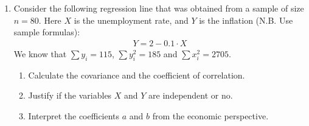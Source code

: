 \documentclass[12pt]{article}
\begin{document}
\begin{enumerate}
{\begin{enumerate}
\item Find the slope of the regression \( Y = a + b \cdot X \) and interpret it:

\begin{itemize}
    \item The slope \( b \) is calculated as:
    \[
    b = \frac{\sigma_{xy}}{\sigma_x^2} = \frac{-0.02}{6.16} = -0.0032.
    \]
    \item Interpretation: For each additional degree of Celsius in temperature, the electricity consumption \( Y \) is expected to decrease by approximately \( 0.0032 \) kWh. However, since the slope is very small, this change is negligible.
\end{itemize}

\item What is the predicted daily electricity consumption in kWh if the temperature is \( x^* = 19 \) degrees of Celsius?

\begin{itemize}
    \item The predicted electricity consumption is calculated using the regression equation:
    \[
    \hat{Y} = a + b \cdot x^*.
    \]
    \item First, calculate the intercept \( a \):
    \[
    a = \bar{y} - b \cdot \bar{x} = 5.6 - (-0.0032 \times 20.2) \approx 5.6.
    \]
    \item Now, substitute \( x^* = 19 \) into the regression equation:
    \[
    \hat{Y} = 5.6 + (-0.0032) \times 19 \approx 5.6 \text{ kWh}.
    \]
    \item Interpretation: If the temperature is \( 19 \) degrees Celsius, the model predicts an electricity consumption of approximately \( 5.6 \) kWh.
\end{itemize}

\end{enumerate}


}

\item   Consider the following regression line that was obtained from a sample of size $n=80$. Here $X$ is the unemployment rate, and $Y$ is the inflation (N.B. Use sample formulas):
\begin{align*}
Y = 2-0.1\cdot X
\end{align*}
We know that $\sum y_i=115$, $\sum y_i^2=185$ and $\sum x_i^2=2705$.

\begin{enumerate}
\item  Calculate the covariance and the coefficient of correlation.
\item  Justify if the variables $X$ and $Y$ are independent or no.
\item  Interpret the coefficients $a$ and $b$ from the economic perspective.
\end{enumerate}


\end{enumerate}
\end{document}
